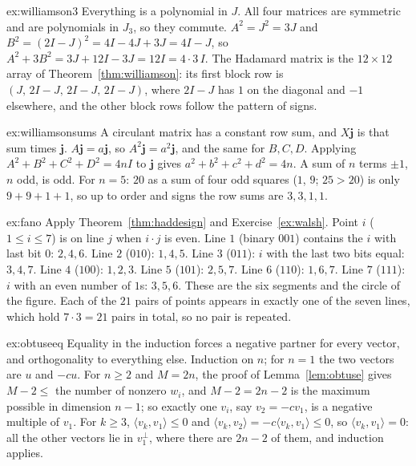\begin{solution}{ex:williamson3}
\idea Everything is a polynomial in $J$.
\writeup All four matrices are symmetric and are polynomials in $J_3$, so they commute. $A^2=J^2=3J$ and $B^2=(2I-J)^2=4I-4J+3J=4I-J$, so
$A^2+3B^2=3J+12I-3J=12I=4\cdot3\,I$. The Hadamard matrix is the $12\times12$ array of Theorem~\ref{thm:williamson}: its first block row is
$(J,\,2I-J,\,2I-J,\,2I-J)$, where $2I-J$ has $1$ on the diagonal and $-1$ elsewhere, and the other block rows follow the pattern of signs.
\end{solution}

\begin{solution}{ex:williamsonsums}
\idea A circulant matrix has a constant row sum, and $X\mathbf j$ is that sum times $\mathbf j$.
\writeup $A\mathbf j=a\mathbf j$, so $A^2\mathbf j=a^2\mathbf j$, and the same for $B,C,D$. Applying $A^2+B^2+C^2+D^2=4nI$ to $\mathbf j$ gives
$a^2+b^2+c^2+d^2=4n$. A sum of $n$ terms $\pm1$, $n$ odd, is odd. For $n=5$: $20$ as a sum of four odd squares ($1$, $9$; $25>20$) is only $9+9+1+1$, so
up to order and signs the row sums are $3,3,1,1$.
\end{solution}

\begin{solution}{ex:fano}
\idea Apply Theorem~\ref{thm:haddesign} and Exercise~\ref{ex:walsh}.
\writeup Point $i$ ($1\le i\le7$) is on line $j$ when $i\cdot j$ is even. Line $1$ (binary $001$) contains the $i$ with last bit $0$: $2,4,6$. Line $2$
($010$): $1,4,5$. Line $3$ ($011$): $i$ with the last two bits equal: $3,4,7$. Line $4$ ($100$): $1,2,3$. Line $5$ ($101$): $2,5,7$. Line $6$ ($110$):
$1,6,7$. Line $7$ ($111$): $i$ with an even number of $1$s: $3,5,6$. These are the six segments and the circle of the figure. Each of the $21$ pairs of
points appears in exactly one of the seven lines, which hold $7\cdot3=21$ pairs in total, so no pair is repeated.
\end{solution}

\begin{solution}{ex:obtuseeq}
\idea Equality in the induction forces a negative partner for every vector, and orthogonality to everything else.
\writeup Induction on $n$; for $n=1$ the two vectors are $u$ and $-cu$. For $n\ge2$ and $M=2n$, the proof of Lemma~\ref{lem:obtuse} gives
$M-2\le$ the number of nonzero $w_i$, and $M-2=2n-2$ is the maximum possible in dimension $n-1$; so exactly one $v_i$, say $v_2=-cv_1$, is a negative
multiple of $v_1$. For $k\ge3$, $\langle v_k,v_1\rangle\le0$ and $\langle v_k,v_2\rangle=-c\langle v_k,v_1\rangle\le0$, so $\langle v_k,v_1\rangle=0$:
all the other vectors lie in $v_1^\perp$, where there are $2n-2$ of them, and induction applies.
\end{solution}

